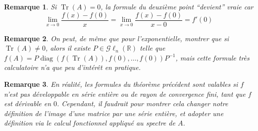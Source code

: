 \documentclass[a4paper]{article}
\newtheorem*{remark}{Remarque}
\begin{document}
\begin{remark}
    Si $\operatorname{Tr}(A) = 0$, la formule du deuxième point ``devient'' vraie car
    $$\displaystyle \lim_{x \to 0} \frac{f(x) - f(0)}{x} =\lim_{x \to 0} \frac{f(x) - f(0)}{x - 0} = f'(0)$$
\end{remark}

\begin{remark}
    On peut, de même que pour l'exponentielle, montrer que si $\operatorname{Tr}(A) \neq 0$, alors il existe $P \in \mathcal{G}\ell_n(\mathbb{R})$ telle que $f(A) = P\operatorname{diag}(f(\operatorname{Tr}(A)), f(0), \dots, f(0))P^{-1}$, mais cette formule très calculatoire n'a que peu d'intérêt en pratique.
\end{remark}

\begin{remark}
    En réalité, les formules du théorème précédent sont valables si $f$ n'est pas développable en série entière ou de rayon de convergence fini, tant que $f$ est dérivable en $0$. Cependant, il faudrait pour montrer cela changer notre définition de l'image d'une matrice par une série entière, et adopter une définition \emph{via} le calcul fonctionnel appliqué au spectre de $A$.
\end{remark}
\end{document}
